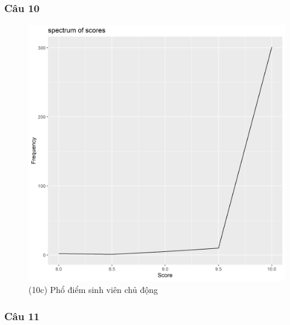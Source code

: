 \documentclass[a4paper]{article}
\theoremstyle{definition}
\begin{document}
\subsubsection{Câu 10}
\newpage
\begin{figure}[!ht]
    \centering
    \includegraphics[scale=0.4]{Pics/q10c_file4.png}
    \caption{(10c) Phổ điểm sinh viên chủ động}
    \label{fig:my_label}
\end{figure}
\newpage
\subsubsection{Câu 11}

\end{document}
